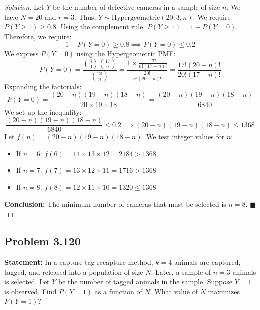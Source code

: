 \documentclass[11pt]{article}
\theoremstyle{definition}
\theoremstyle{remark}
\begin{document}
\begin{proof}[Solution]
Let $Y$ be the number of defective cameras in a sample of size $n$. We have $N = 20$ and $r = 3$. Thus, $Y \sim \text{Hypergeometric}(20, 3, n)$.
We require $P(Y \ge 1) \ge 0.8$.
Using the complement rule, $P(Y \ge 1) = 1 - P(Y = 0)$. Therefore, we require:
\[ 1 - P(Y = 0) \ge 0.8 \implies P(Y = 0) \le 0.2 \]
We express $P(Y = 0)$ using the Hypergeometric PMF:
\[ P(Y = 0) = \frac{\binom{3}{0}\binom{17}{n}}{\binom{20}{n}} = \frac{1 \times \frac{17!}{n!(17-n)!}}{\frac{20!}{n!(20-n)!}} = \frac{17!(20-n)!}{20!(17-n)!} \]
Expanding the factorials:
\[ P(Y = 0) = \frac{(20-n)(19-n)(18-n)}{20 \times 19 \times 18} = \frac{(20-n)(19-n)(18-n)}{6840} \]
We set up the inequality:
\[ \frac{(20-n)(19-n)(18-n)}{6840} \le 0.2 \implies (20-n)(19-n)(18-n) \le 1368 \]
Let $f(n) = (20-n)(19-n)(18-n)$. We test integer values for $n$:
\begin{itemize}
    \item If $n = 6$: $f(6) = 14 \times 13 \times 12 = 2184 > 1368$
    \item If $n = 7$: $f(7) = 13 \times 12 \times 11 = 1716 > 1368$
    \item If $n = 8$: $f(8) = 12 \times 11 \times 10 = 1320 \le 1368$
\end{itemize}
\textbf{Conclusion:} The minimum number of cameras that must be selected is $n = 8$. $\blacksquare$
\end{proof}

\subsection*{Problem 3.120}
\textbf{Statement:} In a capture-tag-recapture method, $k=4$ animals are captured, tagged, and released into a population of size $N$. Later, a sample of $n=3$ animals is selected. Let $Y$ be the number of tagged animals in the sample. Suppose $Y=1$ is observed. Find $P(Y=1)$ as a function of $N$. What value of $N$ maximizes $P(Y=1)$?
\end{document}
